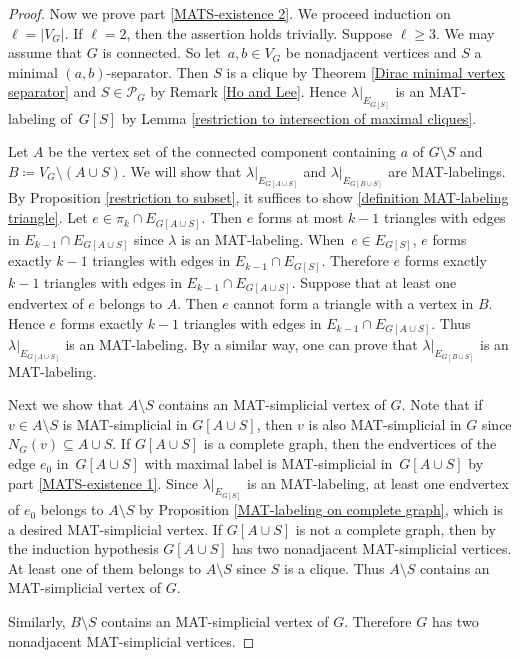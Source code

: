 \documentclass[ALCO, Unicode,published]{cedram}
\begin{document}
\begin{proof}
Now we prove part \ref{MATS-existence 2}. 
 We proceed induction on $ \ell = |V_{G}| $. 
If $ \ell=2 $, then the assertion holds trivially. 
Suppose $ \ell \geq 3 $. 
We may assume that $ G $ is connected. 
So let~$ a,b \in V_{G} $ be nonadjacent vertices and $ S $ a minimal $ (a,b) $-separator. 
Then $ S $ is a clique by Theorem \ref{Dirac minimal vertex separator} and $ S \in \mathcal{P}_{G} $ by Remark \ref{Ho and Lee}. 
Hence $ \lambda|_{E_{G[S]}} $ is an MAT-labeling of~$ G[S] $ by Lemma \ref{restriction to intersection of maximal cliques}.

Let $ A $ be the vertex set of the connected component containing $ a $ of $ G\setminus S $ and $ B \coloneqq V_{G} \setminus (A \cup S) $. 
We will show that $ \lambda|_{E_{G[A\cup S]}} $ and $ \lambda|_{E_{G[B\cup S]}} $ are MAT-labelings. 
By Proposition \ref{restriction to subset}, it suffices to show \ref{definition MAT-labeling triangle}. 
Let $ e \in \pi_{k} \cap E_{G[A \cup S]} $. 
Then $ e $ forms at most $ k-1 $ triangles with edges in $ E_{k-1} \cap E_{G[A \cup S]} $ since $ \lambda $ is an MAT-labeling. 
When~$ e \in E_{G[S]} $, $ e $ forms exactly $ k-1 $ triangles with edges in $ E_{k-1} \cap E_{G[S]} $. 
Therefore $ e $ forms exactly $ k-1 $ triangles with edges in $ E_{k-1} \cap E_{G[A \cup S]} $. 
Suppose that at least one endvertex of $ e $ belongs to $ A $. 
Then $ e $ cannot form a triangle with a vertex in $ B $. 
Hence $ e $ forms exactly $ k-1 $ triangles with edges in $ E_{k-1} \cap E_{G[A \cup S]} $. 
Thus $ \lambda|_{E_{G[A\cup S]}} $ is an MAT-labeling.
By a similar way, one can prove that $ \lambda|_{E_{G[B\cup S]}} $ is an MAT-labeling.


Next we show that $ A \setminus S $ contains an MAT-simplicial vertex of $ G $. 
Note that if~$ v \in A \setminus S $ is MAT-simplicial in $ G[A\cup S] $, then $ v $ is also MAT-simplicial in $ G $ since $ N_{G}(v) \subseteq A \cup S $. 
If $ G[A \cup S] $ is a complete graph, then the endvertices of the edge $ e_{0} $ in~$ G[A \cup S] $ with maximal label is MAT-simplicial in~$ G[A \cup S] $ by  part \ref{MATS-existence 1}. 
Since $ \lambda|_{E_{G[S]}} $ is an MAT-labeling, at least one endvertex of $ e_{0} $ belongs to $ A \setminus S $ by Proposition \ref{MAT-labeling on complete graph}, which is a desired MAT-simplicial vertex. 
If $ G[A \cup S] $ is not a complete graph, then by the induction hypothesis $ G[A \cup S] $ has two nonadjacent MAT-simplicial vertices. 
At least one of them belongs to $ A \setminus S $ since $ S $ is a clique. 
Thus $ A \setminus S $ contains an MAT-simplicial vertex of $ G $. 

Similarly, $ B \setminus S $ contains an MAT-simplicial vertex of $ G $. 
Therefore $ G $ has two nonadjacent MAT-simplicial vertices. 
\end{proof}
\end{document}
